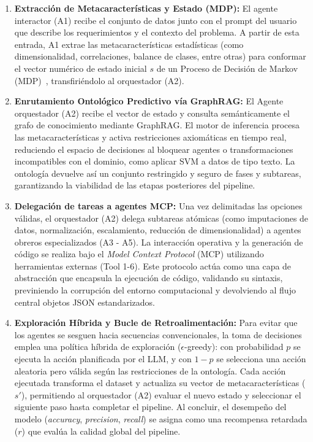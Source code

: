 \documentclass[conference]{IEEEtran}
\begin{document}
\begin{enumerate}
\item \textbf{Extracción de Metacaracterísticas y Estado (MDP):} El agente interactor (A1) recibe el conjunto de datos junto con el prompt del usuario que describe los requerimientos y el contexto del problema. A partir de esta entrada, A1 extrae las metacaracterísticas estadísticas (como dimensionalidad, correlaciones, balance de clases, entre otras) para conformar el vector numérico de estado inicial $s$ de un Proceso de Decisión de Markov (MDP)~\cite{sabbioni2023stepsize}, transfiriéndolo al orquestador (A2).

\item \textbf{Enrutamiento Ontológico Predictivo vía GraphRAG:} El Agente orquestador (A2) recibe el vector de estado y consulta semánticamente el grafo de conocimiento mediante GraphRAG. El motor de inferencia procesa las metacaracterísticas y activa restricciones axiomáticas en tiempo real, reduciendo el espacio de decisiones al bloquear agentes o transformaciones incompatibles con el dominio, como aplicar SVM a datos de tipo texto. La ontología devuelve así un conjunto restringido y seguro de fases y subtareas, garantizando la viabilidad de las etapas posteriores del pipeline.

\item \textbf{Delegación de tareas a agentes MCP:} Una vez delimitadas las opciones válidas, el orquestador (A2) delega subtareas atómicas (como imputaciones de datos, normalización, escalamiento, reducción de dimensionalidad) a agentes obreros especializados (A3 - A5). La interacción operativa y la generación de código se realiza bajo el \textit{Model Context Protocol} (MCP) utilizando herramientas externas (Tool 1-6). Este protocolo actúa como una capa de abstracción que encapsula la ejecución de código, validando su sintaxis, previniendo la corrupción del entorno computacional y devolviendo al flujo central objetos JSON estandarizados.

\item \textbf{Exploración Híbrida y Bucle de Retroalimentación:} Para evitar que los agentes se sesguen hacia secuencias convencionales, la toma de decisiones emplea una política híbrida de exploración ($\epsilon$-greedy): con probabilidad $p$ se ejecuta la acción planificada por el LLM, y con $1-p$ se selecciona una acción aleatoria pero válida según las restricciones de la ontología. Cada acción ejecutada transforma el dataset y actualiza su vector de metacaracterísticas ($s'$), permitiendo al orquestador (A2) evaluar el nuevo estado y seleccionar el siguiente paso hasta completar el pipeline. Al concluir, el desempeño del modelo (\textit{accuracy}, \textit{precision}, \textit{recall}) se asigna como una recompensa retardada ($r$) que evalúa la calidad global del pipeline.

\end{enumerate}
\end{document}
